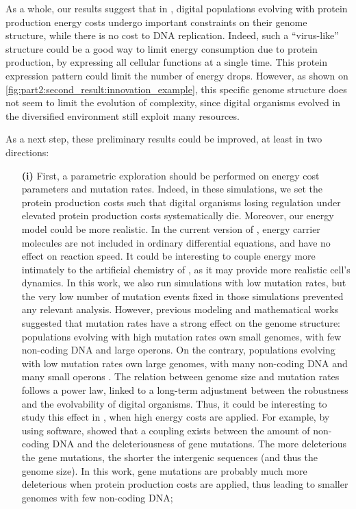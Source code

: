 As a whole, our results suggest that in {\EvoEvoSim}, digital populations evolving with protein production energy costs undergo important constraints on their genome structure, while there is no cost to DNA replication. Indeed, such a ``virus-like'' structure could be a good way to limit energy consumption due to protein production, by expressing all cellular functions at a single time. This protein expression pattern could limit the number of energy drops. However, as shown on \ref{fig:part2:second_result:innovation_example}, this specific genome structure does not seem to limit the evolution of complexity, since digital organisms evolved in the diversified environment still exploit many resources.

As a next step, these preliminary results could be improved, at least in two directions:
\begin{enumerate}
\item[\textbf{(i)}] First, a parametric exploration should be performed on energy cost parameters and mutation rates. Indeed, in these simulations, we set the protein production costs such that digital organisms losing regulation under elevated protein production costs systematically die. Moreover, our energy model could be more realistic. In the current version of {\EvoEvoSim}, energy carrier molecules are not included in ordinary differential equations, and have no effect on reaction speed. It could be interesting to couple energy more intimately to the artificial chemistry of {\EvoEvoSim}, as it may provide more realistic cell's dynamics. In this work, we also run simulations with low mutation rates, but the very low number of mutation events fixed in those simulations prevented any relevant analysis. However, previous modeling and mathematical works suggested that mutation rates have a strong effect on the genome structure: populations evolving with high mutation rates own small genomes, with few non-coding DNA and large operons. On the contrary, populations evolving with low mutation rates own large genomes, with many non-coding DNA and many small operons \citep{knibbe-et-al-2007a,beslon-et-al-2010a,fischer-et-al-2014}. The relation between genome size and mutation rates follows a power law, linked to a long-term adjustment between the robustness and the evolvability of digital organisms. Thus, it could be interesting to study this effect in {\EvoEvoSim}, when high energy costs are applied. For example, by using {\aevol} software, \cite{knibbe-et-al-2007b} showed that a coupling exists between the amount of non-coding DNA and the deleteriousness of gene mutations. The more deleterious the gene mutations, the shorter the intergenic sequences (and thus the genome size). In this work, gene mutations are probably much more deleterious when protein production costs are applied, thus leading to smaller genomes with few non-coding DNA;

\end{enumerate}
